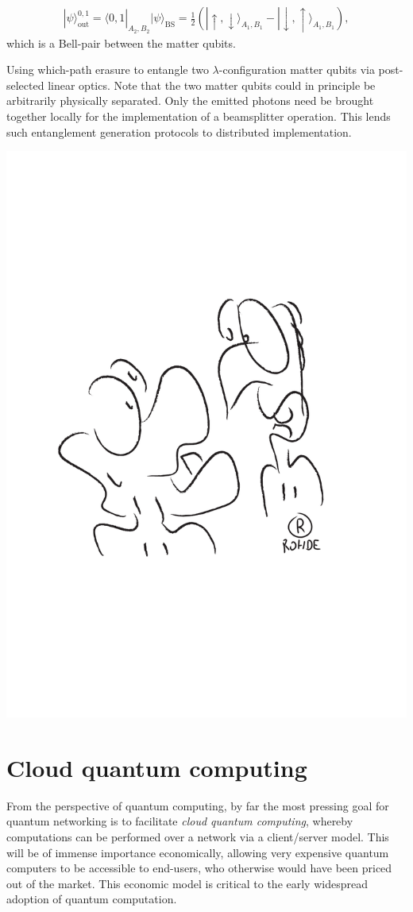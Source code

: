 \documentclass[aps, rmp, twocolumn, amsmath, amssymb, nofootinbib, superscriptaddress, longbibliography, floatfix, table-of-contents, eqsecnum]{revtex4-1}
\newcommand{\bra}[1]{\langle#1|}
\newcommand{\ket}[1]{|#1\rangle}
\begin{document}
\begin{table}[!htb]
{{{\begin{enumerate}
\begin{align}
\ket\psi_\text{out}^{0,1} = \bra{0,1}_{A_2,B_2} \ket\psi_\text{BS} = \frac{1}{2} (\ket{\!\uparrow,\downarrow}_{A_1,B_1} - \ket{\!\downarrow,\uparrow}_{A_1,B_1}),
\end{align}
which is a Bell-pair between the matter qubits.
\end{enumerate}}}}
\caption{Using which-path erasure to entangle two $\lambda$-configuration matter qubits via post-selected linear optics. Note that the two matter qubits could in principle be arbitrarily physically separated. Only the emitted photons need be brought together locally for the implementation of a beamsplitter operation. This lends such entanglement generation protocols to distributed implementation.} \label{alg:which_path}
\end{table}

\begin{center}
	\includegraphics[width=0.6\columnwidth]{sketch_25}
\end{center}

%
%

\section{Cloud quantum computing} \label{sec:cloud} 

From the perspective of quantum computing, by far the most pressing goal for quantum networking is to facilitate \textit{cloud quantum computing}, whereby computations can be performed over a network via a client/server model. This will be of immense importance economically, allowing very expensive quantum computers to be accessible to end-users, who otherwise would have been priced out of the market. This economic model is critical to the early widespread adoption of quantum computation.
\end{document}
